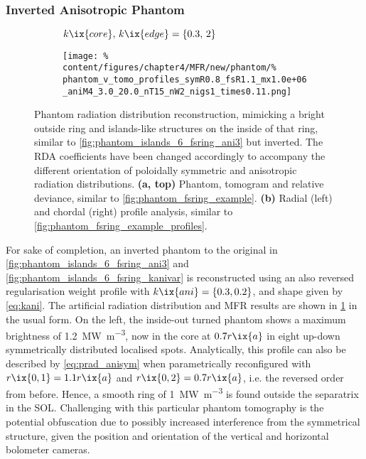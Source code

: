         \subsubsection*{Inverted Anisotropic Phantom}%
%
            \begin{figure}[t]%
                \centering%
                \begin{subfigure}{\textwidth}%
                    \centering%
                    \caption{$k\ix{core},\,k\ix{edge}=\left\{0.3,\,2\right\}$}%
                \end{subfigure}%
                \newline%
                \begin{subfigure}{\textwidth}%
                    \centering%
                    \texttt{[image: \%
                        content/figures/chapter4/MFR/new/phantom/\%
                        phantom\_v\_tomo\_profiles\_symR0.8\_fsR1.1\_mx1.0e+06\_aniM4\_3.0\_20.0\_nT15\_nW2\_nigs1\_times0.11.png]}%
                    \caption{}%
                \end{subfigure}%
                \caption{Phantom radiation distribution reconstruction, mimicking a bright outside ring and islands-like structures on the inside of that ring, similar to \cref{fig:phantom_islands_6_fsring_ani3} but inverted. The RDA coefficients have been changed accordingly to accompany the different orientation of poloidally symmetric and anisotropic radiation distributions. \textbf{(a, top)} Phantom, tomogram and relative deviance, similar to \cref{fig:phantom_fsring_example}. \textbf{(b)} Radial (left) and chordal (right) profile analysis, similar to \cref{fig:phantom_fsring_example_profiles}.}\label{fig:phantom_inside_islands_6_fsring}%
            \end{figure}%
%
            For sake of completion, an inverted phantom to the original in \cref{fig:phantom_islands_6_fsring_ani3} and \ref{fig:phantom_islands_6_fsring_kanivar} is reconstructed using an also reversed regularisation weight profile with $k\ix{ani}=\left\{0.3, 0.2\right\}$, and shape given by \cref{eq:kani}. The artificial radiation distribution and MFR results are shown in \cref{fig:phantom_inside_islands_6_fsring} in the usual form. On the left, the inside-out turned phantom shows a maximum brightness of \SI{1.2}{\mega\watt\per\cubic\meter}, now in the core at $0.7r\ix{a}$ in eight up-down symmetrically distributed localised spots. Analytically, this profile can also be described by \cref{eq:prad_anisym} when parametrically reconfigured with $r\ix{0,1}=1.1r\ix{a}$ and $r\ix{0,2}=0.7r\ix{a}$, i.e. the reversed order from before. Hence, a smooth ring of \SI{1}{\mega\watt\per\cubic\meter} is found outside the separatrix in the SOL. Challenging with this particular phantom tomography is the potential obfuscation due to possibly increased interference from the symmetrical structure, given the position and orientation of the vertical and horizontal bolometer cameras.\\%
